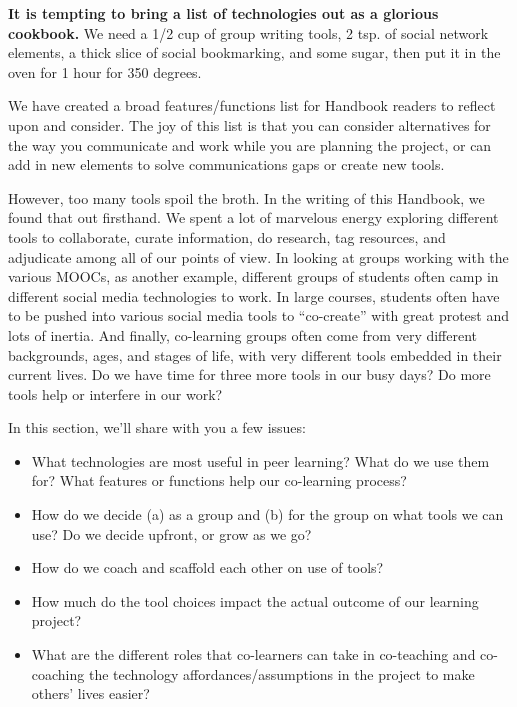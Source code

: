 \textbf{It is tempting to bring a list of technologies out as a glorious
cookbook.} We need a 1/2 cup of group writing tools, 2 tsp. of social
network elements, a thick slice of social bookmarking, and some sugar,
then put it in the oven for 1 hour for 350 degrees.

We have created a broad features/functions list for Handbook readers to
reflect upon and consider. The joy of this list is that you can consider
alternatives for the way you communicate and work while you are planning
the project, or can add in new elements to solve communications gaps or
create new tools.

However, too many tools spoil the broth. In the writing of this
Handbook, we found that out firsthand. We spent a lot of marvelous
energy exploring different tools to collaborate, curate information, do
research, tag resources, and adjudicate among all of our points of view.
In looking at groups working with the various MOOCs, as another example,
different groups of students often camp in different social media
technologies to work. In large courses, students often have to be pushed
into various social media tools to ``co-create'' with great protest and
lots of inertia. And finally, co-learning groups often come from very
different backgrounds, ages, and stages of life, with very different
tools embedded in their current lives. Do we have time for three more
tools in our busy days? Do more tools help or interfere in our work?

In this section, we'll share with you a few issues:

\begin{itemize}
\item
  What technologies are most useful in peer learning? What do we use
  them for? What features or functions help our co-learning process?
\end{itemize}
\begin{itemize}
\item
  How do we decide (a) as a group and (b) for the group on what tools we
  can use? Do we decide upfront, or grow as we go?
\end{itemize}
\begin{itemize}
\item
  How do we coach and scaffold each other on use of tools?
\end{itemize}
\begin{itemize}
\item
  How much do the tool choices impact the actual outcome of our learning
  project?
\end{itemize}
\begin{itemize}
\item
  What are the different roles that co-learners can take in co-teaching
  and co-coaching the technology affordances/assumptions in the project
  to make others' lives easier?
\end{itemize}
